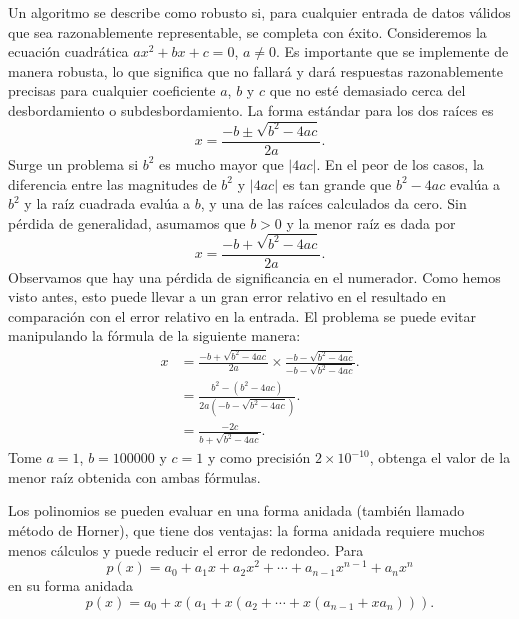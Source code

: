 \begin{questions}
    \question

    Un algoritmo se describe como robusto si, para cualquier entrada
    de datos válidos que sea razonablemente representable, se
    completa con éxito.
    Consideremos la ecuación cuadrática $ax^{2}+bx+c=0$, $a\neq 0$.
    Es importante que se implemente de manera robusta, lo que
    significa que no fallará y dará respuestas
    razonablemente precisas para cualquier coeficiente $a$, $b$ y
    $c$ que no esté demasiado cerca del desbordamiento o
    subdesbordamiento.
    La forma estándar para los dos raíces es
    \begin{equation*}
        x=
        \frac{-b\pm\sqrt{b^{2}-4ac}}{2a}.
    \end{equation*}
    Surge un problema si $b^{2}$ es mucho mayor que
    $\left|4ac\right|$.
    En el peor de los casos, la diferencia entre las magnitudes de
    $b^{2}$ y $\left|4ac\right|$ es tan grande que $b^{2}-4ac$ evalúa
    a $b^{2}$ y la raíz cuadrada evalúa a $b$, y una de las raíces
    calculados da cero.
    Sin pérdida de generalidad, asumamos que $b>0$ y la menor raíz es
    dada por
    \begin{equation*}
        x=
        \frac{-b+\sqrt{b^{2}-4ac}}{2a}.
    \end{equation*}
    Observamos que hay una pérdida de significancia en el numerador.
    Como hemos visto antes, esto puede llevar a un gran error
    relativo en el resultado en comparación con el error relativo en
    la entrada.
    El problema se puede evitar manipulando la fórmula de la
    siguiente manera:
    \begin{align*}
        x & =
        \frac{-b+\sqrt{b^{2}-4ac}}{2a}\times
        \frac{-b-\sqrt{b^{2}-4ac}}{-b-\sqrt{b^{2}-4ac}}.                         \\
          & =
        \frac{b^{2}-\left(b^{2}-4ac\right)}{2a\left(-b-\sqrt{b^{2}-4ac}\right)}. \\
          & =
        \frac{-2c}{b+\sqrt{b^{2}-4ac}}.
    \end{align*}
    Tome $a=1$, $b=100000$ y $c=1$ y como precisión
    $2\times 10^{-10}$, obtenga el valor de la menor raíz obtenida
    con ambas fórmulas.

    \question

    Los polinomios se pueden evaluar en una forma anidada (también
    llamado método de Horner), que tiene dos ventajas:
    la forma anidada requiere muchos menos cálculos y puede reducir
    el error de redondeo.
    Para
    \begin{equation*}
        p\left(x\right)=
        a_{0}+
        a_{1}x+
        a_{2}x^{2}+
        \cdots+
        a_{n-1}x^{n-1}+
        a_{n}x^{n}
    \end{equation*}
    en su forma anidada
    \begin{equation*}
        p\left(x\right)=
        a_{0}+
        x
        \left(
        a_{1}+
        x
        \left(
        a_{2}+
        \cdots+x
        \left(
        a_{n-1}+
        xa_{n}
        \right)
        \right)
        \right).
    \end{equation*}


\end{questions}

